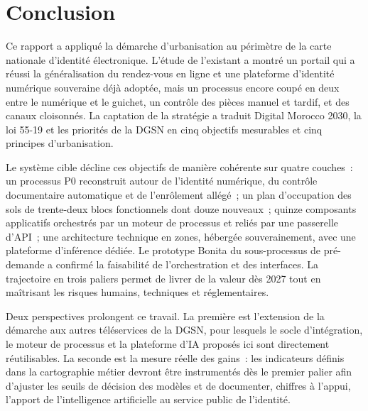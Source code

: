 \section{Conclusion}
Ce rapport a appliqué la démarche d'urbanisation au périmètre de la carte nationale d'identité électronique. L'étude de l'existant a montré un portail qui a réussi la généralisation du rendez-vous en ligne et une plateforme d'identité numérique souveraine déjà adoptée, mais un processus encore coupé en deux entre le numérique et le guichet, un contrôle des pièces manuel et tardif, et des canaux cloisonnés. La captation de la stratégie a traduit Digital Morocco 2030, la loi 55-19 et les priorités de la DGSN en cinq objectifs mesurables et cinq principes d'urbanisation.

Le système cible décline ces objectifs de manière cohérente sur quatre couches~: un processus P0 reconstruit autour de l'identité numérique, du contrôle documentaire automatique et de l'enrôlement allégé~; un plan d'occupation des sols de trente-deux blocs fonctionnels dont douze nouveaux~; quinze composants applicatifs orchestrés par un moteur de processus et reliés par une passerelle d'API~; une architecture technique en zones, hébergée souverainement, avec une plateforme d'inférence dédiée. Le prototype Bonita du sous-processus de pré-demande a confirmé la faisabilité de l'orchestration et des interfaces. La trajectoire en trois paliers permet de livrer de la valeur dès 2027 tout en maîtrisant les risques humains, techniques et réglementaires.

Deux perspectives prolongent ce travail. La première est l'extension de la démarche aux autres téléservices de la DGSN, pour lesquels le socle d'intégration, le moteur de processus et la plateforme d'IA proposés ici sont directement réutilisables. La seconde est la mesure réelle des gains~: les indicateurs définis dans la cartographie métier devront être instrumentés dès le premier palier afin d'ajuster les seuils de décision des modèles et de documenter, chiffres à l'appui, l'apport de l'intelligence artificielle au service public de l'identité.
